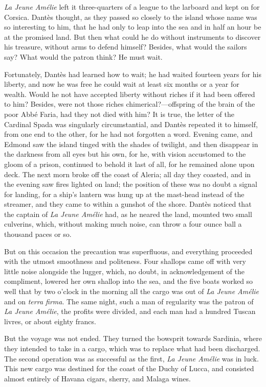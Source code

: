  \textit{La Jeune Amélie} left it three-quarters of a league to the larboard and kept on for Corsica. Dantès thought, as they passed so closely to the island whose name was so interesting to him, that he had only to leap into the sea and in half an hour be at the promised land. But then what could he do without instruments to discover his treasure, without arms to defend himself? Besides, what would the sailors say? What would the patron think? He must wait. 

 Fortunately, Dantès had learned how to wait; he had waited fourteen years for his liberty, and now he was free he could wait at least six months or a year for wealth. Would he not have accepted liberty without riches if it had been offered to him? Besides, were not those riches chimerical?—offspring of the brain of the poor Abbé Faria, had they not died with him? It is true, the letter of the Cardinal Spada was singularly circumstantial, and Dantès repeated it to himself, from one end to the other, for he had not forgotten a word.  Evening came, and Edmond saw the island tinged with the shades of twilight, and then disappear in the darkness from all eyes but his own, for he, with vision accustomed to the gloom of a prison, continued to behold it last of all, for he remained alone upon deck. The next morn broke off the coast of Aleria; all day they coasted, and in the evening saw fires lighted on land; the position of these was no doubt a signal for landing, for a ship's lantern was hung up at the mast-head instead of the streamer, and they came to within a gunshot of the shore. Dantès noticed that the captain of \textit{La Jeune Amélie} had, as he neared the land, mounted two small culverins, which, without making much noise, can throw a four ounce ball a thousand paces or so. 

 But on this occasion the precaution was superfluous, and everything proceeded with the utmost smoothness and politeness. Four shallops came off with very little noise alongside the lugger, which, no doubt, in acknowledgement of the compliment, lowered her own shallop into the sea, and the five boats worked so well that by two o'clock in the morning all the cargo was out of \textit{La Jeune Amélie} and on \textit{terra firma}. The same night, such a man of regularity was the patron of \textit{La Jeune Amélie}, the profits were divided, and each man had a hundred Tuscan livres, or about eighty francs. 

 But the voyage was not ended. They turned the bowsprit towards Sardinia, where they intended to take in a cargo, which was to replace what had been discharged. The second operation was as successful as the first, \textit{La Jeune Amélie} was in luck. This new cargo was destined for the coast of the Duchy of Lucca, and consisted almost entirely of Havana cigars, sherry, and Malaga wines. 

